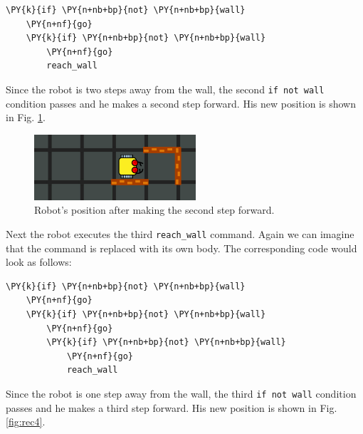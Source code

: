 \begin{bbox}
\begin{Verbatim}[commandchars=\\\{\}]
\PY{k}{if} \PY{n+nb+bp}{not} \PY{n+nb+bp}{wall}
    \PY{n+nf}{go}
    \PY{k}{if} \PY{n+nb+bp}{not} \PY{n+nb+bp}{wall}
        \PY{n+nf}{go}
        reach_wall
\end{Verbatim}
\end{bbox}
\vspace{6mm}

\noindent
Since the robot is two steps away from the wall, the second {\tt if not wall} condition passes and 
he makes a second step forward. His new position is shown in Fig. \ref{fig:rec3}.

\begin{figure}[!ht]
\begin{center}
\includegraphics[width=6cm]{img/rec-3.png}
\end{center}
\vspace{-4mm}
\caption{Robot's position after making the second step forward.}
\label{fig:rec3}
\vspace{-4mm}
\end{figure}
\noindent
Next the robot executes the third {\tt reach\_wall} command. Again we can imagine that the command 
is replaced with its own body. The corresponding code would look as follows:\\

\begin{bbox}
\begin{Verbatim}[commandchars=\\\{\}]
\PY{k}{if} \PY{n+nb+bp}{not} \PY{n+nb+bp}{wall}
    \PY{n+nf}{go}
    \PY{k}{if} \PY{n+nb+bp}{not} \PY{n+nb+bp}{wall}
        \PY{n+nf}{go}
        \PY{k}{if} \PY{n+nb+bp}{not} \PY{n+nb+bp}{wall}
            \PY{n+nf}{go}
            reach_wall
\end{Verbatim}
\end{bbox}
\vspace{6mm}

\noindent
Since the robot is one step away from the wall, the third {\tt if not wall} condition passes and 
he makes a third step forward. His new position is shown in Fig. \ref{fig:rec4}.
\newpage

